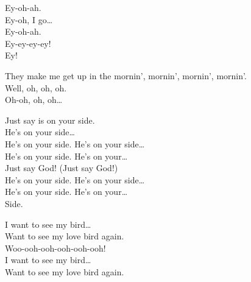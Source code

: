 Ey-oh-ah. \\
Ey-oh, I go… \\

Ey-oh-ah. \\
Ey-ey-ey-ey! \\

Ey! \\




They make me get up in the mornin', mornin', mornin', mornin'. \\

Well, oh, oh, oh. \\
Oh-oh, oh, oh… \\




Just say  is on your side. \\
He's on your side… \\

He's on your side. He's on your side… \\
He's on your side. He's on your… \\

Just say God! (Just say God!) \\

He's on your side. He's on your side… \\
He's on your side. He's on your… \\
Side. \\




I want to see my  bird… \\
Want to see my love bird again. \\

Woo-ooh-ooh-ooh-ooh-ooh! \\

I want to see my  bird… \\
Want to see my love bird again. \\

